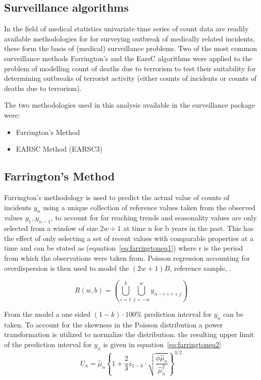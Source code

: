 \subsection{Surveillance algorithms}
In the field of medical statistics univariate time series of count data are readily available methodologies for for surveying outbreak of medically related incidents, these form
the basis of (medical) surveillance problems. Two of the most common surveillance methods Farrington's \citep{farrington1996statistical} and the EarsC algorithms \citep{fricker2008comparing} were applied to the problem of modelling count of deaths due to terrorism to test their suitability for determining outbreaks of terrorist activity (either counts of incidents or counts of deaths due to terrorism).

The two methodologies used in this analysis available in the surveillance package \citep{surveillancepackageR} were:

\begin{itemize}
\item Farrington's Method
\item  EARSC Method (EARSC3)
\end{itemize}

\subsection{Farrington's Method}
Farrington's methodology \citep{salmon2016monitoring} is  used to predict the actual value of counts of incidents $y_{n}$ using a unique collection of reference values taken from the observed values $y_{1}..y_{n-1}$, to account for far reaching trends and seasonality values are only selected from a window of size $2w+1$ at time n for b years in the past. This has the effect of only selecting a set of recent values with comparable properties at a time and can be stated as (equation~\ref{eq:farringtoneq1})
where r is the period from which the observations were taken from. Poisson regression accounting for overdispersion is then used to model the $(2w+1)B$, reference sample, \citep{robertson2010review}.


\begin{equation} 
R(w,b)=(\bigcup_{i=1}^{b}\bigcup_{j=-w}^{w} y_{n-i+r+j})
\label{eq:farringtoneq1}  \end{equation} 

From the model a one sided $(1-k)\cdot 100\%$ prediction interval for $y_{n}$ can be taken. To account for the skewness in the Poisson distribution a power transformation is utilized to normalize the distribution. the resulting upper limit of the prediction interval for $y_{n}$ is given in equation~\ref{eq:farringtoneq2}
\begin{equation} 
U_{n}=\hat{\mu}_{n}\!\left \{ 1+\frac{2}{3}z_{1-k}\cdot\sqrt{ \frac{{\phi}\hat{\mu}_{n}}{\hat{\mu}^{2}_n}}  \right\}^{3/2}
\label{eq:farringtoneq2}  \end{equation}

